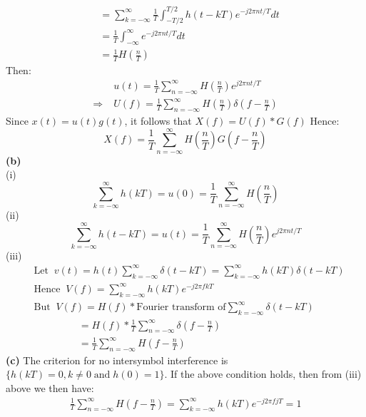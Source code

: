 \documentclass[a4paper,12pt]{article}
\begin{document}
\begin{enumerate}
\begin{align*}
                    &= \sum_{k = -\infty}^{\infty} \frac{1}{T} \int_{-T/2}^{T/2} h(t - kT) e^{-j2 \pi nt/T} dt \\
                    &= \frac{1}{T} \int_{-\infty}^{\infty} e^{-j2 \pi nt/T}dt \\ 
                    &= \frac{1}{T} H(\frac{n}{T}) 
            \end{align*}
            Then:
            \begin{align*}
                &u(t) = \frac{1}{T} \sum_{n = -\infty}^{\infty} H(\frac{n}{T})e^{j2\pi nt/T} \\ 
                \Rightarrow \; & U(f) = \frac{1}{T} \sum_{n = -\infty}^{\infty} H(\frac{n}{T}) \delta(f - \frac{n}{T})
            \end{align*}
            Since $x(t) = u(t)g(t)$, it follows that $X(f) = U(f) * G(f)$ Hence: $$X(f) = \frac{1}{T} \sum_{n = -\infty}^{\infty} H(\frac{n}{T}) G(f - \frac{n}{T})$$ 
            \textbf{(b)} \\
            (i) $$\sum_{k = -\infty}^{\infty} h(kT) = u(0) = \frac{1}{T} \sum_{n = -\infty}^{\infty} H(\frac{n}{T})$$ 
            (ii) $$\sum_{k = -\infty}^{\infty} h(t - kT) = u(t) = \frac{1}{T} \sum_{n = -\infty}^{\infty} H(\frac{n}{T}) e^{j2\pi nt/T}$$ 
            (iii) 
            \begin{align*}
                & \text{Let} \;\; v(t) = h(t)\sum_{k = -\infty}^{\infty} \delta(t - kT) = \sum_{k = -\infty}^{\infty} h(kT) \delta(t - kT) \\ 
                & \text{Hence} \;\; V(f) = \sum_{k = -\infty}^{\infty} h(kT) e^{-j2\pi fkT} \\ 
                & \text{But} \;\; V(f) = H(f) * \text{Fourier transform of} \sum_{k = -\infty}^{\infty} \delta(t - kT) \\
                &   \;\;\;\;\;\;\;\;\;\;\;\;\;\;\;\; = H(f) * \frac{1}{T} \sum_{n = -\infty}^{\infty} \delta(f - \frac{n}{T}) \\
                &   \;\;\;\;\;\;\;\;\;\;\;\;\;\;\;\; = \frac{1}{T} \sum_{n = -\infty}^{\infty} H(f - \frac{n}{T})
            \end{align*}
            \textbf{(c)} 
            The criterion for no intersymbol interference is $\{ h(kT) = 0, k \neq 0 \; \text{and} \; h(0) = 1 \}$. If the above condition holds, then from (iii) above we then have:
            \begin{align*}
                \frac{1}{T} \sum_{n = -\infty}^{\infty} H(f - \frac{n}{T}) = \sum_{k = -\infty}^{\infty} h(kT)e^{-j2\pi fjT} = 1

\end{align*}
\end{enumerate}
\end{document}
